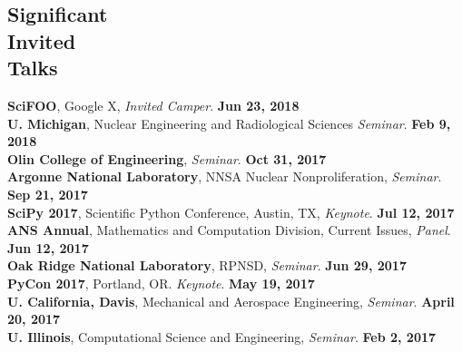 \documentclass[margin,line]{resume}
\begin{document}
\begin{resume}
    \section{\mysidestyle Significant\\Invited\\Talks}
      \textbf{SciFOO}, Google X, \emph{Invited Camper}.  \hfill\textbf{Jun 23, 2018}\\
      \textbf{U. Michigan}, Nuclear Engineering and Radiological Sciences \emph{Seminar}.  \hfill\textbf{Feb 9, 2018}\\
      \textbf{Olin College of Engineering}, \emph{Seminar}.  \hfill\textbf{Oct 31, 2017}\\
      \textbf{Argonne National Laboratory}, NNSA Nuclear Nonproliferation, \emph{Seminar}.  \hfill\textbf{Sep 21, 2017}\\
      \textbf{SciPy 2017}, Scientific Python Conference, Austin, TX, \emph{Keynote}.  \hfill\textbf{Jul 12, 2017}\\
      \textbf{ANS Annual}, Mathematics and Computation Division, Current Issues, \emph{Panel}.  \hfill\textbf{Jun 12, 2017}\\
      \textbf{Oak Ridge National Laboratory}, RPNSD, \emph{Seminar}.  \hfill\textbf{Jun 29, 2017}\\
      \textbf{PyCon 2017}, Portland, OR. \emph{Keynote}.  \hfill\textbf{May 19, 2017}\\
      \textbf{U. California, Davis}, Mechanical and Aerospace Engineering, \emph{Seminar}.  \hfill\textbf{April 20, 2017}\\
      \textbf{U. Illinois}, Computational Science and Engineering, \emph{Seminar}.  \hfill\textbf{Feb 2, 2017}\\

\end{resume}
\end{document}
